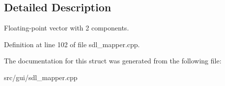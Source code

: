 \subsection{Detailed Description}
Floating-\/point vector with 2 components. 

Definition at line 102 of file sdl\-\_\-mapper.\-cpp.



The documentation for this struct was generated from the following file\-:\begin{DoxyCompactItemize}
\item 
src/gui/sdl\-\_\-mapper.\-cpp\end{DoxyCompactItemize}
